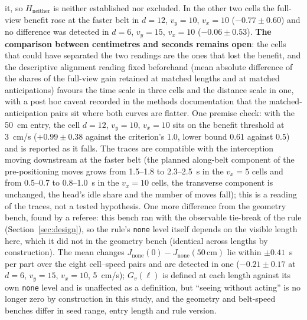 \documentclass[11pt,a4paper]{article}
\newcommand{\nj}{\textsc{nj}}
\begin{document}
it, so $H_{\mathrm{neither}}$ is neither established nor excluded. In the other two
cells the full-view benefit rose at the faster belt in $d=12$, $v_y=10$, $v_x=10$
($-0.77\pm0.60$) and no difference was detected in $d=6$, $v_y=15$, $v_x=10$
($-0.06\pm0.53$).
\textbf{The comparison between centimetres and seconds remains open}: the cells that
could have separated the two readings are the ones that lost the benefit, and the
descriptive alignment reading fixed beforehand (mean absolute difference of the shares
of the full-view gain retained at matched lengths and at matched anticipations) favours
the time scale in three cells and the distance scale in one, with a post hoc caveat
recorded in the methods documentation that the matched-anticipation pairs sit where both
curves are flatter. One premise check: with the 50~cm entry, the cell $d=12$, $v_y=10$, $v_x=10$ sits
on the benefit threshold at 3~cm/s ($+0.99\pm0.38$ against the criterion's 1.0, lower
bound 0.61 against 0.5) and is reported as it falls. The traces are compatible with the
interception moving downstream at the faster belt (the planned along-belt component of
the pre-positioning moves grows from 1.5--1.8 to 2.3--2.5~s in the $v_x=5$ cells and from
0.5--0.7 to 0.8--1.0~s in the $v_x=10$ cells, the transverse component is unchanged, the
head's idle share and the number of moves fall); this is a reading of the traces, not a
tested hypothesis. One more difference from the geometry bench, found by a referee:
this bench ran with the observable tie-break of the rule (Section~\ref{sec:design}), so
the rule's \texttt{none} level itself depends on the visible length here, which it did
not in the geometry bench (identical across lengths by construction). The mean changes
$J_{\mathrm{none}}(0)-J_{\mathrm{none}}(50\,\mathrm{cm})$ lie within $\pm0.41$~s per part
over the eight cell--speed pairs and are detected in one ($-0.21\pm0.17$ at $d=6$,
$v_y=15$, $v_x=10$, 5~cm/s); $G_v(\ell)$ is defined at each length against its own
\texttt{none} level and is unaffected as a definition, but ``seeing without acting'' is
no longer zero by construction in this study, and the geometry and belt-speed benches
differ in seed range, entry length and rule version.

\begin{table}[t]
\centering\small
\caption{Belt-speed bench, \nj, nominal load, Poisson arrivals, 50~cm entry, 60 paired
realizations (seeds used once): the full-view benefit $G_v(50\,\mathrm{cm})$ at 3 and at
5~cm/s with the benefit criterion, the paired costs at 5~cm/s of 10~cm (2.00~s) and
16.7~cm (3.33~s) against 50~cm, the check column $C_3(10\,\mathrm{cm})$ (the 3.33~s cost at
3~cm/s, to be compared with Section~\ref{sec:howmuch}), and the frozen verdict
(conservative reading, margin 0.5~s per part). Seconds per part, 95\,\% CI.}
\label{tab:belt}
\resizebox{\linewidth}{!}{}
\end{table}
\end{document}
